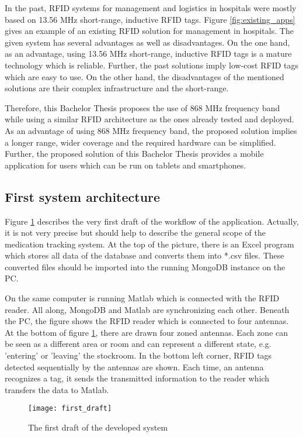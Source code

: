 In the past, RFID systems for management and logistics in hospitals were mostly based on 13.56 MHz short-range, inductive RFID tags.
Figure \ref{fig:existing_apps} gives an example of an existing RFID solution for management in hospitals. The given system has several advantages as well as disadvantages. On the one hand, as an advantage, using 13.56 MHz short-range, inductive RFID tags is a mature technology which is reliable. Further, the past solutions imply low-cost RFID tags which are easy to use. 
On the other hand, the disadvantages of the mentioned solutions are their complex infrastructure and the short-range. 

Therefore, this Bachelor Thesis proposes the use of 868 MHz frequency band while using a similar RFID architecture as the ones already tested and deployed. As an advantage of using 868 MHz frequency band, the proposed solution implies a longer range, wider coverage and the required hardware can be simplified. Further, the proposed solution of this Bachelor Thesis provides a mobile application for users which can be run on tablets and smartphones. 

\subsection{First system architecture} \label{firstconcept}

Figure \ref{fig:first_draft} describes the very first draft of the workflow of the application. Actually, it is not very precise but should help to describe the general scope of the medication tracking system. 
At the top of the picture, there is an Excel program which stores all data of the database and converts them into *.csv files. These converted files should be imported into the running MongoDB instance on the PC. 

On the same computer is running Matlab which is connected with the RFID reader. All along, MongoDB and Matlab are synchronizing each other. Beneath the PC, the figure shows the RFID reader which is connected to four antennas. At the bottom of figure \ref{fig:first_draft}, there are drawn four zoned antennas. Each zone can be seen as a different area or room and can represent a different state, e.g. 'entering' or 'leaving' the stockroom. In the bottom left corner, RFID tags detected sequentially by the antennas are shown. Each time, an antenna recognizes a tag, it sends the transmitted information to the reader which transfers the data to Matlab.  

\begin{figure}
\centering
\texttt{[image: first\_draft]} 
\caption{\label{fig:first_draft}The first draft of the developed system} 
\end{figure}

